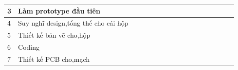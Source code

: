 \begin{landscape}
\begin{table}[]
\begin{tabular}{|l|l|l|l|l|l|l|l|l|l|l|l|l|l|l|l|l|}
3                                           & Làm prototype đầu tiên                                                                            &                          &                                                 &                          & \cellcolor[HTML]{000000} &                          &                          &                          &                          &                          &                          &                          &                          &                          &                          &                          \\ \hline
4                                           & Suy nghĩ design,tổng thể cho cái hộp                                                              &                          &                                                 & \cellcolor[HTML]{000000} & \cellcolor[HTML]{000000} & \cellcolor[HTML]{000000} &                          &                          &                          &                          &                          &                          &                          &                          &                          &                          \\ \hline
5                                           & Thiết kế bản vẽ cho,hộp                                                                           &                          &                                                 &                          &                          &                          & \cellcolor[HTML]{000000} &                          &                          &                          &                          &                          &                          &                          &                          &                          \\ \hline
6                                           & Coding                                                                                            &                          &                                                 &                          &                          &                          & \cellcolor[HTML]{000000} &                          &                          &                          &                          &                          &                          &                          &                          &                          \\ \hline
7                                           & Thiết kế PCB cho,mạch                                                                             &                          &                                                 &                          &                          &                          & \cellcolor[HTML]{000000} & \cellcolor[HTML]{000000} &                          &                          &                          &                          &                          &                          &                          &                          \\ \hline

\end{tabular}
\end{table}
\end{landscape}

